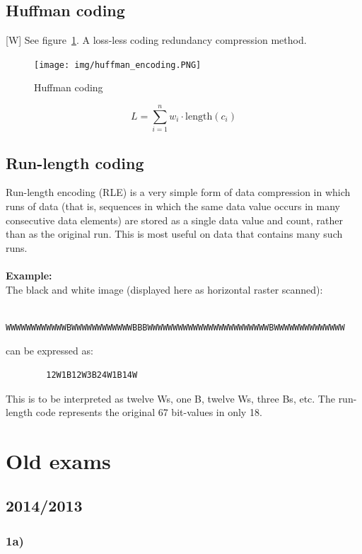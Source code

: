 \documentclass[12pt]{article}
\begin{document}
    \subsection{Huffman coding}
        [W] See figure~\ref{fig:huffman}. A loss-less coding redundancy compression method.
        \begin{figure}[h!]
        \centering
        \texttt{[image: img/huffman\_encoding.PNG]}
        \caption{Huffman coding}
        \label{fig:huffman}
        \end{figure}
        \begin{equation}
            L = \sum_{i=1}^n w_i \cdot \mathrm{length}(c_i)
        \end{equation}
    \subsection{Run-length coding}
    Run-length encoding (RLE) is a very simple form of data compression in which runs of data (that
    is, sequences in which the same data value occurs in many consecutive data elements) are stored
    as a single data value and count, rather than as the original run. This is most useful on data 
    that contains many such runs. \\
    \\
    \textbf{Example:}\\
    The black and white image (displayed here as horizontal raster scanned):
    \begin{verbatim}
        WWWWWWWWWWWWBWWWWWWWWWWWWBBBWWWWWWWWWWWWWWWWWWWWWWWWBWWWWWWWWWWWWWW
    \end{verbatim}
    can be expressed as:
    \begin{verbatim}
        12W1B12W3B24W1B14W
    \end{verbatim}
        This is to be interpreted as twelve Ws, one B, twelve Ws, three Bs, etc.
        The run-length code represents the original 67 bit-values in only 18.    
%	
%	
\section{Old exams}
	\subsection{2014/2013}
	\subsubsection*{1a)}
	
\end{document}
